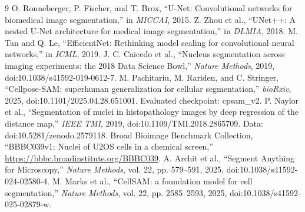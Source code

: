 \documentclass{article}
\begin{document}
\begin{thebibliography}{9}
 O. Ronneberger, P. Fischer, and T. Brox, ``U-Net: Convolutional networks for biomedical image segmentation,'' in \emph{MICCAI}, 2015.
 Z. Zhou et al., ``UNet++: A nested U-Net architecture for medical image segmentation,'' in \emph{DLMIA}, 2018.
 M. Tan and Q. Le, ``EfficientNet: Rethinking model scaling for convolutional neural networks,'' in \emph{ICML}, 2019.
 J. C. Caicedo et al., ``Nucleus segmentation across imaging experiments: the 2018 Data Science Bowl,'' \emph{Nature Methods}, 2019, doi:10.1038/s41592-019-0612-7.
 M. Pachitariu, M. Rariden, and C. Stringer, ``Cellpose-SAM: superhuman generalization for cellular segmentation,'' \emph{bioRxiv}, 2025, doi:10.1101/2025.04.28.651001. Evaluated checkpoint: cpsam\_v2.
 P. Naylor et al., ``Segmentation of nuclei in histopathology images by deep regression of the distance map,'' \emph{IEEE TMI}, 2019, doi:10.1109/TMI.2018.2865709. Data: doi:10.5281/zenodo.2579118.
 Broad Bioimage Benchmark Collection, ``BBBC039v1: Nuclei of U2OS cells in a chemical screen,'' \url{https://bbbc.broadinstitute.org/BBBC039}.
 A. Archit et al., ``Segment Anything for Microscopy,'' \emph{Nature Methods}, vol. 22, pp. 579--591, 2025, doi:10.1038/s41592-024-02580-4.
 M. Marks et al., ``CellSAM: a foundation model for cell segmentation,'' \emph{Nature Methods}, vol. 22, pp. 2585--2593, 2025, doi:10.1038/s41592-025-02879-w.
\end{thebibliography}
\end{document}

